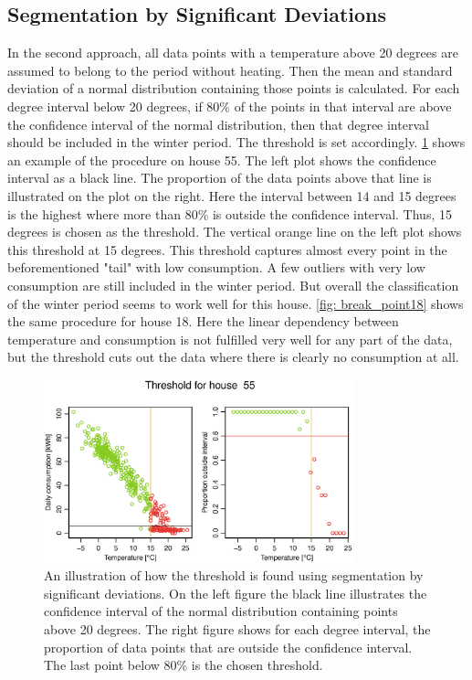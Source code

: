 \subsection{Segmentation by Significant Deviations}
In the second approach, all data points with a temperature
above 20 degrees are assumed to belong to the period without heating. Then the mean and standard deviation of a normal distribution containing those points is calculated.
For each degree interval below 20 degrees, if 80\% of the points in that interval are above the confidence interval of the normal distribution, then that degree interval should be included in the winter period. The threshold is set accordingly. \cref{fig: break_point55} shows an example of the procedure on house 55. The left plot shows the confidence interval as a black line. The proportion of the data points above that line is illustrated on the plot on the right. Here the interval between 14 and 15 degrees is the highest where more than 80\% is outside the confidence interval. Thus, 15 degrees is chosen as the threshold. The vertical orange line on the left plot shows this threshold at 15 degrees. This threshold captures almost every point in the beforementioned "tail" with low consumption. A few outliers with very low consumption are still included in the winter period. But overall the classification of the winter period seems to work well for this house. \cref{fig: break_point18} shows the same procedure for house 18. Here the linear dependency between temperature and consumption is not fulfilled very well for any part of the data, but the threshold cuts out the data where there is clearly no consumption at all.
\begin{figure}
    \centering
    \includegraphics[width=0.8\textwidth]{../../../figures/breakpoint_55.eps}
    \caption{An illustration of how the threshold is found using segmentation by significant deviations. On the left figure the black line illustrates the confidence interval of the normal distribution containing points above 20 degrees. The right figure shows for each degree interval, the proportion of data points that are outside the confidence interval. The last point below 80\% is the chosen threshold.}
    \label{fig: break_point55}
\end{figure}
